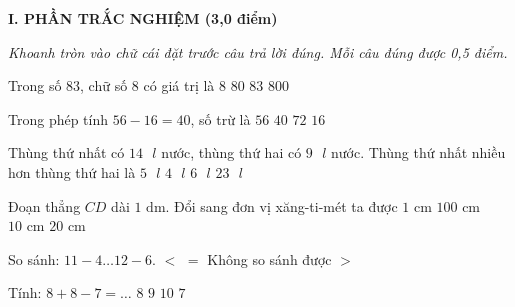 
\setcounter{ex}{0}
\setcounter{bt}{0}

\textbf{\large I. PHẦN TRẮC NGHIỆM (3,0 điểm)}

{\itshape Khoanh tròn vào chữ cái đặt trước câu trả lời đúng. Mỗi câu đúng được 0,5 điểm.}

\begin{ex} %
Trong số $83$, chữ số $8$ có giá trị là
\choice
{$8$}
{\True $80$}
{$83$}
{$800$}
\end{ex}

\begin{ex} %
Trong phép tính $56 - 16 = 40$, số trừ là
\choice
{$56$}
{$40$}
{$72$}
{\True $16$}
\end{ex}

\begin{ex} %
Thùng thứ nhất có $14\text{ }l$ nước, thùng thứ hai có $9\text{ }l$ nước. Thùng thứ nhất nhiều hơn thùng thứ hai là
\choice
{\True $5\text{ }l$}
{$4\text{ }l$}
{$6\text{ }l$}
{$23\text{ }l$}
\end{ex}

\begin{ex} %
Đoạn thẳng $CD$ dài $1\text{ dm}$. Đổi sang đơn vị xăng-ti-mét ta được
\choice
{$1\text{ cm}$}
{$100\text{ cm}$}
{\True $10\text{ cm}$}
{$20\text{ cm}$}
\end{ex}

\begin{ex} %
So sánh: $11 - 4 \dots 12 - 6$.
\choice
{$<$}
{$=$}
{Không so sánh được}
{\True $>$}
\end{ex}

\begin{ex} %
Tính: $8 + 8 - 7 = \dots$
\choice
{$8$}
{\True $9$}
{$10$}
{$7$}
\end{ex}

